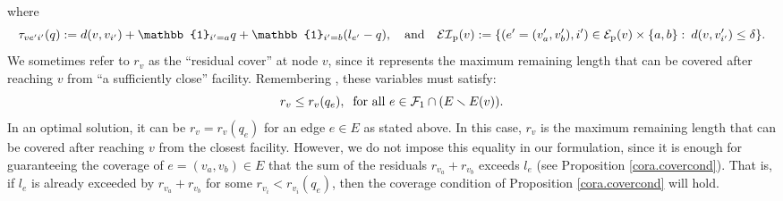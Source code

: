 \documentclass[review]{elsarticle}
\newcommand{\cF}{{\mathcal F}}
\newcommand{\cE}{{\mathcal E}}
\newcommand{\cEI}{{\mathcal {EI}}}
\newcommand{\dlt}{{\delta}}
\theoremstyle{definition}
\begin{document}
where $$ \tau_{ve'i'}(q) := d(v,v_{i'})+ \mathbb{1}_{i'=a}q +\mathbb{1}_{i'=b}(l_{e'} - q),\quad \textup{and}\quad \cEI_{\mathrm{p}}(v) := \{(e'=(v'_a,v'_b),i') \in \cE_{\mathrm{p}}(v) \times \{a,b\}:\: d(v,v'_{i'})\leq \dlt\}.$$ We sometimes refer to $r_v$ as the ``residual cover'' at node $v$, since it represents the maximum remaining length that can be covered after reaching $v$ from ``a sufficiently close'' facility. Remembering , these variables must satisfy:
$$r_v\leq r_v(q_e), \: \textup{ for all } e \in \cF_1 \cap (E \smallsetminus E(v)).$$
In an optimal solution, it can be $r_v=r_v(q_e)$ for an edge $e\in E$ as stated above. In this case, $r_v$ is the maximum remaining length that can be covered after reaching $v$ from the closest facility. However, we do not impose this equality in our formulation, since it is enough for guaranteeing the coverage of $e=(v_a,v_b)\in E$ that the sum of the residuals $r_{v_a}+r_{v_b}$ exceeds $l_e$ (see Proposition \ref{cora.covercond}). That is, if $l_e$ is already exceeded by $r_{v_a}+r_{v_b}$  for some $r_{v_i} < r_{v_i}(q_e)$, then the coverage condition of Proposition \ref{cora.covercond} will hold.
\end{document}

